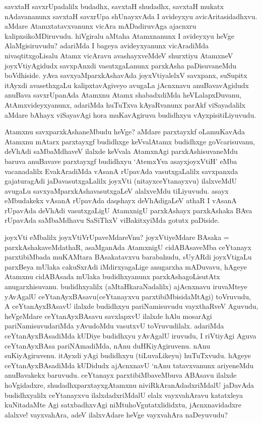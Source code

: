 \begin{artha}
savxtaH savxrUpadalilx budadhx, savxtaH shudadhx, savxtaH  mukatx nAdavananunx savxtaH savxrUpa shUnayxvAda I avideyxyu avicAritasidadhxvu. aMdare Atamxtatavxvanunx vicAra mADadiruvAga ajacnxru kalipxsikoMDiruvudu. hiVgiralu aMtaha Atamxnanunx I avideyxyu heVge AlaMgisiruvudu? adariMda I bageya avideyxyanunx vicAradiMda nivaqtitxgoLisalu Atamx vicAravu avashayxveMdeV shurxtiyu AtamxneV joyxVtiyAgidudx savxpAnxdi vasutxgaLanunx parxkAsha paDisuvaneMdu boVdhiside. yAva savxyaMparxkAshavAda joyxVtiyalelxV savxpanx, suSupitx itAyxdi avasethxgaLu kalipxtavAgiveyo avugaLa jAcnxnavu anuBavavAgidudx anuBava savxrUpanAda Atamxnu Atamx shabadxdiMda heVLalapxDuvanu, AtAmxvideyxyanunx, adariMda huTuTxva kAyaRvanunx parAkf viSayadalilx aMdare bAhayx viSayavAgi hora muKavAgiruva budidhxyu vAyxpisi\break tiLiyuvudu.
\end{artha}

\begin{artha}%
Atamxnu savxparxkAshaneMbudu heVge? aMdare parxtayxkf oLamuKavAda Atamxnu mAtarx parxtayxgf budidhxge keVvalAtamx budidhxge goVcarisuvanu, deVhAdi saMbaMdhaveV ilalxde keVvala AtamxnAgi parxkAshisuvaneMdu baruva anuBavave parxtayxgf budidhxyu `AtemxYva asayxjoyxVtiH' eMba vacanadalilx EvakAradiMda vAsanA rUpavAda vasutxgaLalilx savxpanxda gajaturagAdi jaDavasutxgaLalilx joyxVti (nitayxceYtanayxvu) ilalxveMdU avugaLu savxyaMparxkAshavasutxgaLeV alalxveMdu tiLiyuvudu. asayx eMbudakekx vAsanA rUpavAda daqshayx deVhAdigaLeV athaR I vAsanA rUpavAda deVhAdi vasutxgaLigU AtamxnigU parxkAshayx parxkAshaka BAva rUpavAda saMbaMdhavu SaSiThxV viBakitxyiMda gotutx paDiside.
\end{artha}

\begin{artha}
joyxVti eMbalilx joyxVtiVrUpaveMdareVnu? joyxVtiyeMdare BAsaka = parxkAshakaveMdathaR, asaMganAda AtamxnigU cidABAsaveMba ceYtanayx parxtibiMbada muKAMtara BAsakatavxvu barabahudu, sUyARdi joyxVtigaLu parxBeya mUlaka cakuSxrAdi iMdirxyagaLige anugarxha mADuvavu, hAgeye Atamxnu cidABAsada mUlaka budidhxyanunx parxkAshagoLisutAtx anugarxhisuvanu. budidhxyalilx (aMtaHkaraNadalilx) ajAcnxnavu iruvaMteye yAvAgalU ceYtanAyxBAsavu\break (ceYtanayxvu parxtibiMbisidaMtAgi) toVruvudu, A ceYtanAyxBAsavU ilalxde budidhxyu pariNamisuvudu vayxthaRveV Aguvudu, heVgeMdare ceYtanAyxBAsavu savxlapxvU ilalxde hAlu mosarAgi pariNamisuvudariMda yAvudoMdu vasutxvU toVruvudilalx. adariMda ceYtanAyxBAsadiMda kUDiye budidhxyu yAvAgalU iruvudu, I riVtiyAgi Aguva ceYtanAyxBAsa pariNAmadiMda, nAnu duHKiyAgiruvenu. nAnu suKiyAgiruvenu. itAyxdi yAgi budidhxyu (tiLuvaLikeyu) huTuTxvudu. hAgeye ceYtanAyxBAsadiMda kUDidudx ajAcnxnavU `nAnu tatavxvanunx ariyeneMdu anuBavakekx baruvudu. ceYtanayx parxtibiMbaveMbuva ABAsavu ilalxde hoVgidadxre, shudadhx\break parxtayxgAtamxnu niviRkAranAdadxriMdalU jaDavAda budidhxyalilx ceYtanayxvu ilalxdadxriMdalU elalx vayxvahAravu katatxleya kuNitadaMte Agi satxbadhxvAgi niMtuhoVgutatxlididxtu, jAcnxnavidadxre alalxve! vayxvahAra, adeV ilalxvAdare heVge vayxvahAra naDeyuvudu?
\end{artha}%

